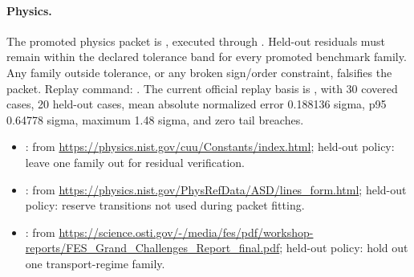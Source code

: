 \paragraph{Physics.}
The promoted physics packet is
, executed through
. Held-out
residuals must remain within the declared tolerance band for every promoted
benchmark family. Any family outside tolerance, or any broken sign/order
constraint, falsifies the packet. Replay command:
.
The current official replay basis is ,
with 30 covered cases, 20 held-out cases, mean absolute normalized error
0.188136 sigma, p95 0.64778 sigma, maximum 1.48 sigma, and zero tail breaches.
\begin{itemize}[leftmargin=1.5em,nosep]
\item {}:  from \url{https://physics.nist.gov/cuu/Constants/index.html}; held-out policy: leave one family out for residual verification.
\item {}:  from \url{https://physics.nist.gov/PhysRefData/ASD/lines_form.html}; held-out policy: reserve transitions not used during packet fitting.
\item {}:  from \url{https://science.osti.gov/-/media/fes/pdf/workshop-reports/FES_Grand_Challenges_Report_final.pdf}; held-out policy: hold out one transport-regime family.
\end{itemize}

